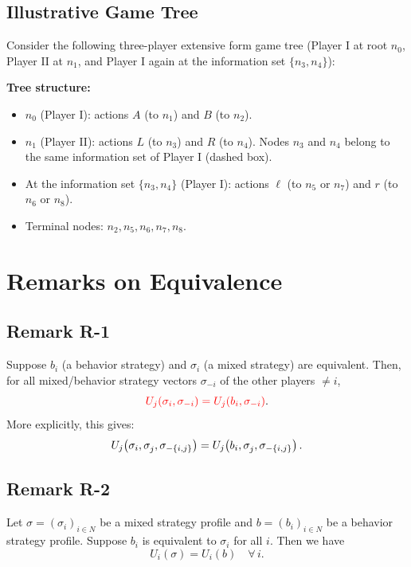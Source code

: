 \documentclass[12pt, a4paper]{article}
\begin{document}
\subsection{Illustrative Game Tree}

Consider the following three-player extensive form game tree (Player I at root $n_0$, Player II at $n_1$, and Player I again at the information set $\{n_3,n_4\}$):

\medskip
\noindent
\textbf{Tree structure:}
\begin{itemize}
  \item $n_0$ (Player I): actions $A$ (to $n_1$) and $B$ (to $n_2$).
  \item $n_1$ (Player II): actions $L$ (to $n_3$) and $R$ (to $n_4$). Nodes $n_3$ and $n_4$ belong to the same information set of Player I (dashed box).
  \item At the information set $\{n_3, n_4\}$ (Player I): actions $\ell$ (to $n_5$ or $n_7$) and $r$ (to $n_6$ or $n_8$).
  \item Terminal nodes: $n_2, n_5, n_6, n_7, n_8$.
\end{itemize}

\section{Remarks on Equivalence}

\subsection*{Remark R-1}

Suppose $b_i$ (a behavior strategy) and $\sigma_i$ (a mixed strategy) are equivalent. Then, for all mixed/behavior strategy vectors $\sigma_{-i}$ of the other players $\neq i$,
\[
  \textcolor{red}{U_j(\sigma_i,\sigma_{-i}) = U_j(b_i,\sigma_{-i})}.
\]
More explicitly, this gives:
\[
  U_j\!\left(\sigma_i,\sigma_j^{\vphantom{x}},\sigma_{-\{i,j\}}\right)
  = U_j\!\left(b_i,\sigma_j^{\vphantom{x}},\sigma_{-\{i,j\}}\right).
\]

\subsection*{Remark R-2}

Let $\sigma = (\sigma_i)_{i\in N}$ be a mixed strategy profile and $b = (b_i)_{i\in N}$ be a behavior strategy profile. Suppose $b_i$ is equivalent to $\sigma_i$ for all $i$. Then we have
\[
  U_i(\sigma) = U_i(b) \quad \forall\, i.
\]
\end{document}
